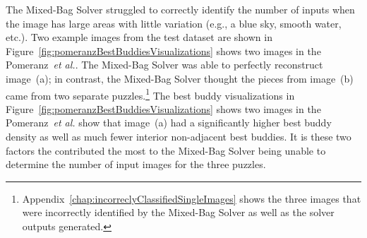 The Mixed-Bag Solver struggled to correctly identify the number of inputs when the image has large areas with little variation (e.g., a blue sky, smooth water, etc.). Two example images from the test dataset are shown in Figure~\ref{fig:pomeranzBestBuddiesVisualizations} shows two images in the Pomeranz~\textit{et al.}.  The Mixed-Bag Solver was able to perfectly reconstruct image~(a); in contrast, the Mixed-Bag Solver thought the pieces from image~(b) came from two separate puzzles.\footnote{Appendix~\ref{chap:incorreclyClassifiedSingleImages} shows the three images that were incorrectly identified by the Mixed-Bag Solver as well as the solver outputs generated.} The best buddy visualizations in Figure~\ref{fig:pomeranzBestBuddiesVisualizations} shows two images in the Pomeranz~\textit{et al.} show that image~(a) had a significantly higher best buddy density as well as much fewer interior non-adjacent best buddies.  It is these two factors the contributed the most to the Mixed-Bag Solver being unable to determine the number of input images for the three puzzles. 


